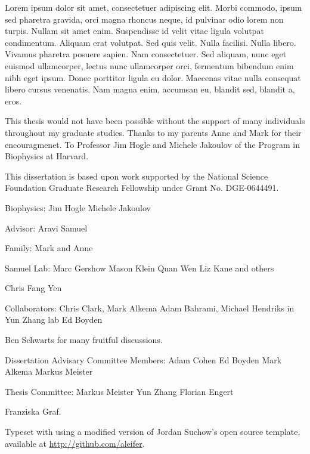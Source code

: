 
Lorem ipsum dolor sit amet, consectetuer adipiscing elit. Morbi commodo, ipsum sed pharetra gravida, orci magna rhoncus neque, id pulvinar odio lorem non turpis. Nullam sit amet enim. Suspendisse id velit vitae ligula volutpat condimentum. Aliquam erat volutpat. Sed quis velit. Nulla facilisi. Nulla libero. Vivamus pharetra posuere sapien. Nam consectetuer. Sed aliquam, nunc eget euismod ullamcorper, lectus nunc ullamcorper orci, fermentum bibendum enim nibh eget ipsum. Donec porttitor ligula eu dolor. Maecenas vitae nulla consequat libero cursus venenatis. Nam magna enim, accumsan eu, blandit sed, blandit a, eros.

This thesis would not have been possible without the support of many individuals throughout my graduate studies. Thanks to my parents Anne and Mark for their encouragmenet. To Professor Jim Hogle and Michele Jakoulov of the Program in Biophysics at Harvard. 

This dissertation is based upon work supported by the National Science Foundation Graduate Research Fellowship under Grant No. DGE-0644491.

Biophysics:
  Jim Hogle
  Michele Jakoulov

Advisor:
  Aravi Samuel

Family:
  Mark and Anne

Samuel Lab:
  Marc Gershow
  Mason Klein
  Quan Wen
  Liz Kane and others

Chris Fang Yen

Collaborators:
   Chris Clark, Mark Alkema
   Adam Bahrami, Michael Hendriks in Yun Zhang lab
   Ed Boyden
   
Ben Schwarts for many fruitful discussions.

Dissertation Advisary Committee Members:
   Adam Cohen
   Ed Boyden
   Mark Alkema
   Markus Meister
   
Thesis Committee:
	Markus Meister
	Yun Zhang
	Florian Engert

Franziska Graf.

Typeset with \LaTeXe using a modified version of Jordan Suchow's open source template, available at \href{https://github.com/aleifer/LaTeX-template-for-Harvard-dissertation}{http://github.com/aleifer}.